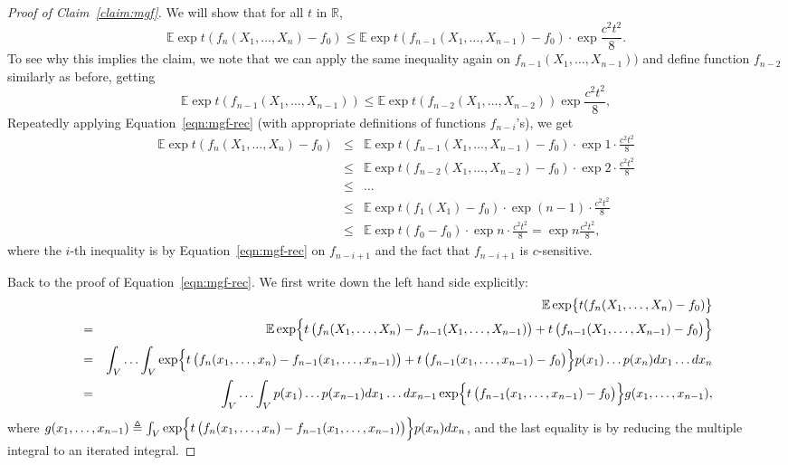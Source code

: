 \documentclass{article}
\newcommand{\RR}{\mathbb{R}} %
\newcommand{\EE}{\mathbb{E}} %
\newcommand{\defeq}{\triangleq}
\begin{document}
\begin{proof}[Proof of Claim~\ref{claim:mgf}]
We will show that for all $t$ in $\RR$,
\begin{equation}
  \EE \exp{t (f_n(X_1,\ldots,X_n) - f_0)} \leq \EE \exp{t (f_{n-1}(X_1, \ldots, X_{n-1}) - f_0)} \cdot \exp{\frac{c^2 t^2}{8}}.
  \label{eqn:mgf-rec}
\end{equation}
To see why this implies the claim, we note that we can apply the same inequality again on $f_{n-1}(X_1, \ldots, X_{n-1}))$ and define function $f_{n-2}$ similarly as before, getting
\[ \EE \exp{t (f_{n-1}(X_1, \ldots, X_{n-1}))} \leq \EE \exp{t (f_{n-2}(X_1, \ldots, X_{n-2}))} \exp{\frac{c^2 t^2}{8}}, \]
Repeatedly applying Equation~\eqref{eqn:mgf-rec} (with appropriate definitions of functions $f_{n-i}$'s), we get
\begin{eqnarray*}
  \EE \exp{t (f_n(X_1,\ldots,X_n) - f_0)}
  &\leq& \EE \exp{t (f_{n-1}(X_1, \ldots, X_{n-1}) - f_0)} \cdot \exp{1 \cdot \frac{c^2 t^2}{8}} \\
  &\leq& \EE \exp{t (f_{n-2}(X_1, \ldots, X_{n-2}) - f_0)} \cdot \exp{2 \cdot \frac{c^2 t^2}{8}} \\
  &\leq& \ldots \\
  &\leq& \EE \exp{t (f_1(X_1) - f_0)} \cdot \exp{(n-1) \cdot \frac{c^2 t^2}{8}} \\
  &\leq& \EE \exp{t (f_0 - f_0)} \cdot \exp{n \cdot \frac{c^2 t^2}{8}} = \exp{n  \frac{c^2 t^2}{8}},
\end{eqnarray*}
where the $i$-th inequality is by Equation~\eqref{eqn:mgf-rec} on $f_{n-i+1}$ and the fact that $f_{n-i+1}$ is $c$-sensitive.

Back to the proof of Equation~\eqref{eqn:mgf-rec}. We first write down the left hand side explicitly:
\begin{eqnarray}
  && \EE \exp{t (f_n(X_1,\ldots,X_n) - f_0)} \nonumber \\
  &=& \EE \exp{ t\del{f_n(X_1,\ldots,X_n) - f_{n-1}(X_1,\ldots,X_{n-1})} + t\del{f_{n-1}(X_1,\ldots,X_{n-1}) - f_0}} \nonumber\\
  &=& \int_V \ldots \int_V \exp{ t\del{f_n(x_1,\ldots,x_n) - f_{n-1}(x_1,\ldots,x_{n-1})} + t\del{f_{n-1}(x_1,\ldots,x_{n-1}) - f_0}} p(x_1) \ldots p(x_n) d x_1 \ldots d x_n \nonumber \\
  &=& \int_V \ldots \int_V p(x_1) \ldots p(x_{n-1}) d x_1 \ldots d x_{n-1} \exp{t\del{f_{n-1}(x_1,\ldots,x_{n-1}) - f_0}} g(x_1, \ldots, x_{n-1}), \label{eqn:expand-int}
\end{eqnarray}
where $g(x_1, \ldots, x_{n-1}) \defeq \int_V \exp{ t\del{f_n(x_1,\ldots,x_n) - f_{n-1}(x_1,\ldots,x_{n-1})}} p(x_n) d x_n$, and the last equality is by reducing the multiple integral to an iterated integral.


\end{proof}
\end{document}
